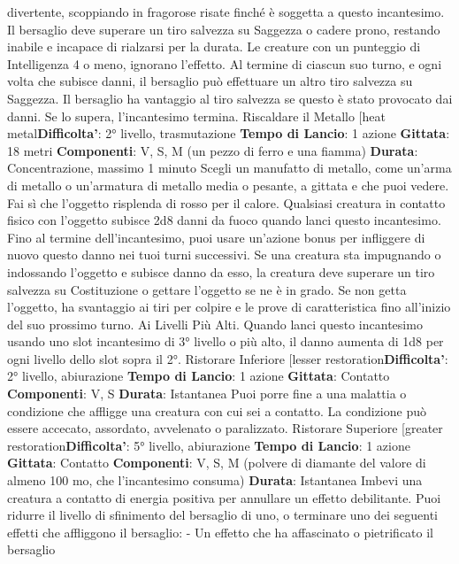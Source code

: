 \begin{multicols}{2}
divertente, scoppiando in fragorose risate finché è
soggetta a questo incantesimo. Il bersaglio deve
superare un tiro salvezza su Saggezza o cadere prono,
restando inabile e incapace di rialzarsi per la durata. Le
creature con un punteggio di Intelligenza 4 o meno,
ignorano l’effetto.
Al termine di ciascun suo turno, e ogni volta che
subisce danni, il bersaglio può effettuare un altro tiro
salvezza su Saggezza. Il bersaglio ha vantaggio al tiro
salvezza se questo è stato provocato dai danni. Se lo
supera, l’incantesimo termina.
Riscaldare il Metallo
[heat metal\textbf{Difficolta'}:
2° livello, trasmutazione
\textbf{Tempo di Lancio}: 1 azione
\textbf{Gittata}: 18 metri
\textbf{Componenti}: V, S, M (un pezzo di ferro e una fiamma)
\textbf{Durata}: Concentrazione, massimo 1 minuto
Scegli un manufatto di metallo, come un’arma di
metallo o un’armatura di metallo media o pesante, a
gittata e che puoi vedere. Fai sì che l’oggetto risplenda
di rosso per il calore. Qualsiasi creatura in contatto
fisico con l’oggetto subisce 2d8 danni da fuoco quando
lanci questo incantesimo. Fino al termine
dell’incantesimo, puoi usare un’azione bonus per
infliggere di nuovo questo danno nei tuoi turni
successivi.
Se una creatura sta impugnando o indossando l’oggetto
e subisce danno da esso, la creatura deve superare un
tiro salvezza su Costituzione o gettare l’oggetto se ne è
in grado. Se non getta l’oggetto, ha svantaggio ai tiri per
colpire e le prove di caratteristica fino all’inizio del suo
prossimo turno.
Ai Livelli Più Alti. Quando lanci questo incantesimo
usando uno slot incantesimo di 3° livello o più alto, il
danno aumenta di 1d8 per ogni livello dello slot sopra il
2°.
Ristorare Inferiore
[lesser restoration\textbf{Difficolta'}:
2° livello, abiurazione
\textbf{Tempo di Lancio}: 1 azione
\textbf{Gittata}: Contatto
\textbf{Componenti}: V, S
\textbf{Durata}: Istantanea
Puoi porre fine a una malattia o condizione che affligge
una creatura con cui sei a contatto. La condizione può
essere accecato, assordato, avvelenato o paralizzato.
Ristorare Superiore
[greater restoration\textbf{Difficolta'}:
5° livello, abiurazione
\textbf{Tempo di Lancio}: 1 azione
\textbf{Gittata}: Contatto
\textbf{Componenti}: V, S, M (polvere di diamante del valore di
almeno 100 mo, che l’incantesimo consuma)
\textbf{Durata}: Istantanea
Imbevi una creatura a contatto di energia positiva per
annullare un effetto debilitante. Puoi ridurre il livello di
sfinimento del bersaglio di uno, o terminare uno dei
seguenti effetti che affliggono il bersaglio:
- Un effetto che ha affascinato o pietrificato il
bersaglio

\end{multicols}
